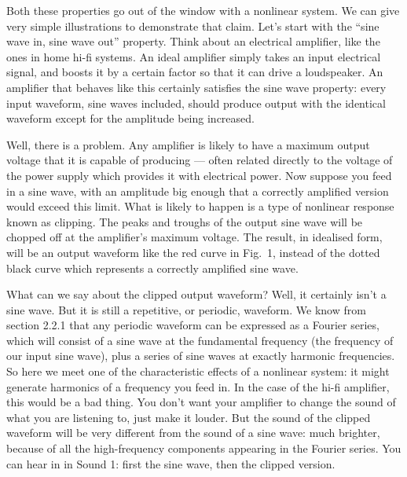   Both these properties go out of the window with a nonlinear system. We can 
  give very simple illustrations to demonstrate that claim. Let’s start with 
  the “sine wave in, sine wave out” property. Think about an electrical 
  amplifier, like the ones in home hi-fi systems. An ideal amplifier simply 
  takes an input electrical signal, and boosts it by a certain factor so that 
  it can drive a loudspeaker. An amplifier that behaves like this certainly 
  satisfies the sine wave property: every input waveform, sine waves included, 
  should produce output with the identical waveform except for the amplitude 
  being increased. 

  Well, there is a problem. Any amplifier is likely to have a maximum output 
  voltage that it is capable of producing — often related directly to the 
  voltage of the power supply which provides it with electrical power. Now 
  suppose you feed in a sine wave, with an amplitude big enough that a 
  correctly amplified version would exceed this limit. What is likely to happen 
  is a type of nonlinear response known as clipping. The peaks and troughs of 
  the output sine wave will be chopped off at the amplifier’s maximum voltage. 
  The result, in idealised form, will be an output waveform like the red curve 
  in Fig.\ 1, instead of the dotted black curve which represents a correctly 
  amplified sine wave. 


  What can we say about the clipped output waveform? Well, it certainly isn’t a 
  sine wave. But it is still a repetitive, or periodic, waveform. We know from 
  section 2.2.1 that any periodic waveform can be expressed as a Fourier 
  series, which will consist of a sine wave at the fundamental frequency (the 
  frequency of our input sine wave), plus a series of sine waves at exactly 
  harmonic frequencies. So here we meet one of the characteristic effects of a 
  nonlinear system: it might generate harmonics of a frequency you feed in. In 
  the case of the hi-fi amplifier, this would be a bad thing. You don’t want 
  your amplifier to change the sound of what you are listening to, just make it 
  louder. But the sound of the clipped waveform will be very different from the 
  sound of a sine wave: much brighter, because of all the high-frequency 
  components appearing in the Fourier series. You can hear in in Sound 1: first 
  the sine wave, then the clipped version. 

